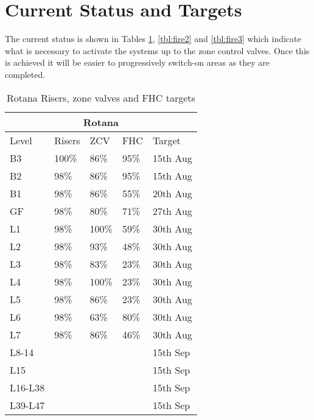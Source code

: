 \section{Current Status and Targets}

The current status is shown in Tables \ref{tbl:fire1}, \ref{tbl:fire2} and \ref{tbl:fire3} which indicate what is necessary to activate the systems up to 
the zone control valves. Once this is achieved it will be easier to progressively switch-on areas as they are completed.
\begin{table}[htbp]\label{tbl:fire1}
\begin{center}
\begin{tabular}{lllll}
\toprule
\multicolumn{5}{c}{Rotana}\\
\midrule
Level	&Risers &ZCV	&FHC  &Target\\
\midrule
B3	&100\% &86\%	 &95\%  &15th Aug\\
B2	&98\%	  &86\%	&95\%   &15th Aug\\
\midrule
B1	&98\%	 &86\%	&55\%  &20th Aug\\
GF	&98\%	 &80\%	&71\%  &27th Aug\\
\midrule
L1	&98\%	 &100\%	&59\%  &30th Aug\\
L2	&98\%	 &93\%	&48\%  &30th Aug\\
L3	&98\%	 &83\%	&23\%  &30th Aug\\
L4	&98\%	 &100\%	&23\%  &30th Aug\\
L5	&98\%	 &86\%	&23\%  &30th Aug\\
L6	&98\%	 &63\%	&80\%  &30th Aug\\
L7	&98\%	&86\%	&46\%              &30th Aug\\
\midrule
L8-14	&         &          &      &15th Sep\\ 	 	 
L15	&        &           &      &15th Sep\\ 	 	 
L16-L38 &      &           &      &15th Sep\\	 	 	 
L39-L47 &      &           &      &15th Sep\\	 	 	 
\bottomrule
\end{tabular}
\caption{Rotana Risers, zone valves and FHC targets}
\end{center}
\end{table}

